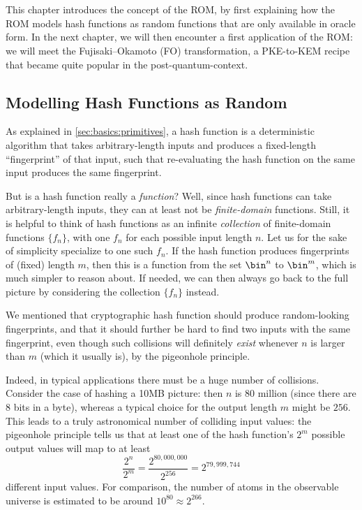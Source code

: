\section{\titleRom}\label{sec:rom}
  This chapter introduces the concept of the ROM,
  	by first explaining how the ROM models hash functions as random functions
  	that are only available in oracle form.
  	In the next chapter, we will then encounter a first application of the ROM:
  	we will meet the Fujisaki--Okamoto (FO) transformation,
  	a PKE-to-KEM recipe that became quite popular in the post-quantum-context.

  \subsection{Modelling Hash Functions as Random}
    As explained in \cref{sec:basics:primitives}, a hash function is 
      a deterministic algorithm that takes arbitrary-length inputs and produces
      a fixed-length ``fingerprint'' of that input, such that re-evaluating the hash function on
      the same input produces the same fingerprint. 
      
    But is a hash function really a \emph{function}? Well, since hash functions can take arbitrary-length
      inputs, they can at least not be \emph{finite-domain} functions. Still, it is
      helpful to think of hash functions as an infinite \emph{collection} of
      finite-domain functions $\{f_n\}$, with one $f_n$ for each possible input length $n$. 
      Let us for the sake of simplicity specialize to one such $f_n$.
      If the hash function produces fingerprints of (fixed) length $m$, then
      this is a function from the set $\bin^n$ to $\bin^m$, which is much
      simpler to reason about. If needed, we can then always go back to the full
      picture by considering the collection $\{f_n\}$ instead.

    We mentioned that cryptographic hash function should produce
      random-looking fingerprints, and that it should further be hard
      to find two inputs with the same fingerprint,
      even though such collisions will definitely \emph{exist} whenever $n$ is
      larger than $m$ (which it usually is), by the pigeonhole principle.

    Indeed, in typical applications there must be a huge number of collisions.
      Consider the case of hashing a 10MB picture: then $n$ is $80$ million (since there are
      $8$ bits in a byte), whereas a typical choice for the output length $m$
      might be $256$. 
      This leads to a truly astronomical number of colliding input values: the pigeonhole
      principle tells us that at least one of the hash function's $2^m$ possible
      output values will map to at least 
      \[
        \frac{2^n}{2^m} = \frac{2^{80{,}000{,}000}}{2^{256}} = 2^{79{,}999{,}744}
      \]
      different input values. For comparison, the
      number of atoms in the observable universe is estimated to be
      around $10^{80} \approx 2^{266}$.

